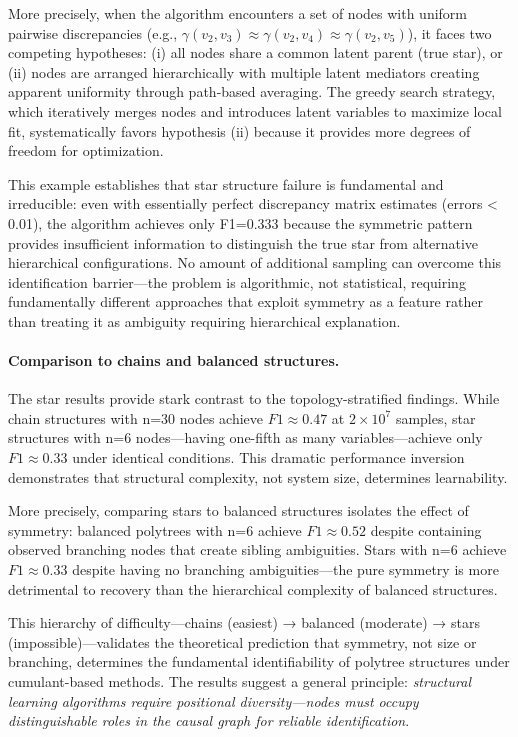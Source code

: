 \documentclass[11pt,a4paper]{article}
\numberwithin{equation}{section}
\begin{document}
More precisely, when the algorithm encounters a set of nodes with uniform pairwise discrepancies (e.g., $\gamma(v_2, v_3) \approx \gamma(v_2, v_4) \approx \gamma(v_2, v_5)$), it faces two competing hypotheses: (i) all nodes share a common latent parent (true star), or (ii) nodes are arranged hierarchically with multiple latent mediators creating apparent uniformity through path-based averaging. The greedy search strategy, which iteratively merges nodes and introduces latent variables to maximize local fit, systematically favors hypothesis (ii) because it provides more degrees of freedom for optimization.

This example establishes that star structure failure is fundamental and irreducible: even with essentially perfect discrepancy matrix estimates (errors < 0.01), the algorithm achieves only F1=0.333 because the symmetric pattern provides insufficient information to distinguish the true star from alternative hierarchical configurations. No amount of additional sampling can overcome this identification barrier—the problem is algorithmic, not statistical, requiring fundamentally different approaches that exploit symmetry as a feature rather than treating it as ambiguity requiring hierarchical explanation.

\paragraph{Comparison to chains and balanced structures.} The star results provide stark contrast to the topology-stratified findings. While chain structures with n=30 nodes achieve $F1 \approx 0.47$ at $2 \times 10^7$ samples, star structures with n=6 nodes—having one-fifth as many variables—achieve only $F1 \approx 0.33$ under identical conditions. This dramatic performance inversion demonstrates that structural complexity, not system size, determines learnability.

More precisely, comparing stars to balanced structures isolates the effect of symmetry: balanced polytrees with n=6 achieve $F1 \approx 0.52$ despite containing observed branching nodes that create sibling ambiguities. Stars with n=6 achieve $F1 \approx 0.33$ despite having no branching ambiguities—the pure symmetry is more detrimental to recovery than the hierarchical complexity of balanced structures.

This hierarchy of difficulty—chains (easiest) → balanced (moderate) → stars (impossible)—validates the theoretical prediction that symmetry, not size or branching, determines the fundamental identifiability of polytree structures under cumulant-based methods. The results suggest a general principle: \emph{structural learning algorithms require positional diversity—nodes must occupy distinguishable roles in the causal graph for reliable identification}.
\end{document}
